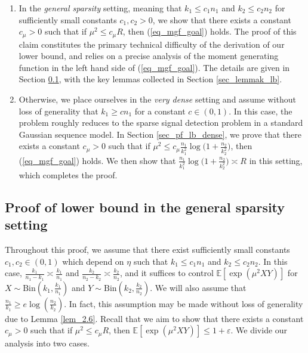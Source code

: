 \documentclass{article}
\newcommand{\EE}{\mathbb{E}}
\newcommand{\eps}{\varepsilon} %
\begin{document}
\begin{enumerate}
    \item In the \textit{general sparsity} setting, meaning that $k_1 \leq c_1 n_1$ and $k_2 \leq c_2 n_2$ for sufficiently small constants $c_1, c_2 > 0$, we show that there exists a constant $c_\mu > 0$ such that if $\mu^2 \leq c_\mu R$, then (\ref{eq_mgf_goal}) holds. The proof of this claim constitutes the primary technical difficulty of the derivation of our lower bound, and relies on a precise analysis of the moment generating function in the left hand side of (\ref{eq_mgf_goal}). The details are given in Section \ref{sec_pf_lb_general}, with the key lemmas collected in Section \ref{sec_lemmak_lb}.
    \item Otherwise, we place ourselves in the \textit{very dense} setting and assume without loss of generality that $k_1 \geq c n_1$ for a constant $c \in (0,1)$. In this case, the problem roughly reduces to the sparse signal detection problem in a standard Gaussian sequence model. In Section \ref{sec_pf_lb_dense}, we prove that there exists a constant $c_\mu > 0$ such that if $\mu^2 \leq c_\mu \frac{n_1}{k_1^2}\log\big(1 + \frac{n_2}{k_2^2}\big)$, then (\ref{eq_mgf_goal}) holds. We then show that $\frac{n_1}{k_1^2}\log\big(1 + \frac{n_2}{k_2^2}\big) \asymp R$ in this setting, which completes the proof.
\end{enumerate}

\subsection{Proof of lower bound in the general sparsity setting}\label{sec_pf_lb_general}
Throughout this proof, we assume that there exist sufficiently small constants $c_1, c_2 \in (0,1)$ which depend on $\eta$ such that $k_1 \leq c_1n_1$ and $k_2 \leq c_2n_2$. In this case, $\frac{k_1}{n_1 - k_1} \asymp \frac{k_1}{n_1}$ and $\frac{k_2}{n_2 - k_2} \asymp \frac{k_2}{n_2}$, and it suffices to control $\EE[\exp(\mu^2XY)]$ for $X \sim \text{Bin}(k_1, \frac{k_1}{n_1})$ and $Y \sim \text{Bin}(k_2, \frac{k_2}{n_2})$. We will also assume that $\frac{n_1}{k_1} \geq e \log(\frac{n_2}{k_2})$. In fact, this assumption may be made without loss of generality due to Lemma \ref{lem_2.6}. Recall that we aim to show that there exists a constant $c_\mu > 0$ such that if $\mu^2 \leq c_\mu R$, then $\EE[\exp(\mu^2XY)] \leq 1 + \eps$. We divide our analysis into two cases.

\bigskip 
\end{document}
